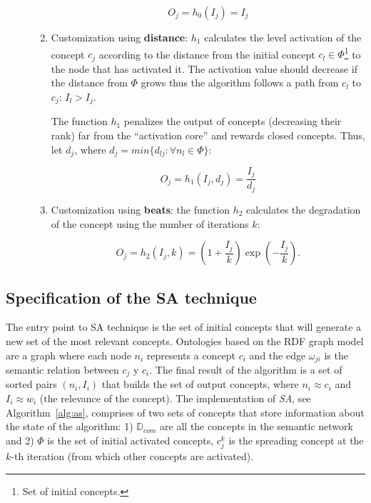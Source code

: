 \begin{description}
\begin{enumerate}
\begin{equation}
O_j = h_0(I_j) = I_j
\end{equation}


\item Customization using {\bf distance}: $h_1$ calculates the level activation
of the concept $c_j$  according to the distance from the initial concept $c_l
\in \Phi$\footnote{Set of initial concepts.} to the node that has activated it. The
activation value should decrease if the distance from $\Phi$ grows thus
the algorithm follows a path from $c_l$ to $c_j$: $I_l > I_j$.


The function $h_1$ penalizes the output of concepts (decreasing their rank)
far from the ``activation core'' and rewards closed concepts. Thus, let $d_j$,
where $d_j = min\{d_{lj}:\forall n_l \in \Phi\}$:


\begin{equation}
 O_j = h_1(I_j,d_j)= \frac{I_j} {d_j}
\end{equation}

\item Customization using {\bf beats}: the function $h_2$ calculates the
degradation of the concept using the number of iterations $k$:

\begin{equation}
 O_j = h_2(I_j,k) = (1+\frac{I_j}{k})\exp(-\frac{I_j}{k}).
\end{equation}

\end{enumerate}

\end{description}

\subsection{Specification of the SA technique}\label{impl-sa}
The entry point to SA technique is the set of initial concepts that will generate 
a new set of the most relevant concepts. Ontologies based on the RDF graph model are a graph where each node $n_i$ represents a concept
$c_i$ and the edge $\omega_{ji}$ is the semantic relation between $c_j$ y $c_i$.
The final result of the algorithm is a set of sorted pairs $(n_i, I_i)$
that builds the set of output concepts, where $n_i\approx c_i$ and $I_i\approx w_i$ (the
relevance of the concept). The implementation of \textit{SA}, see Algorithm~\ref{alg:as}, comprises of two sets of concepts that
store information about the state of the algorithm: 1) $\mathbb{D}_{com}$ are all the concepts in the semantic network 
and 2) $\Phi$ is the set of initial activated concepts, $c_j^k$  is the spreading concept 
at the $k$-th iteration (from which other concepts are activated).

